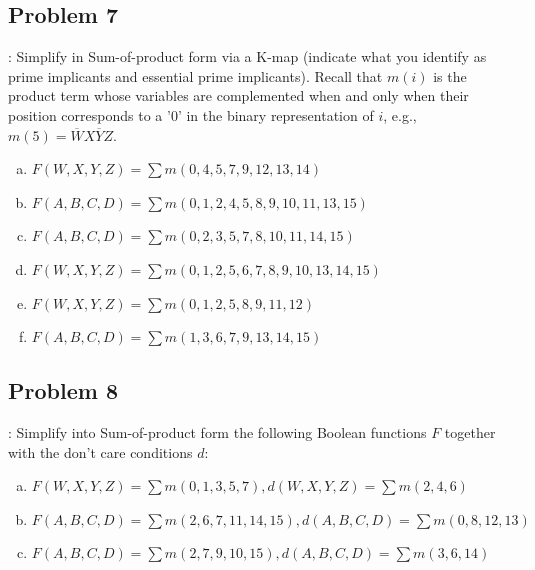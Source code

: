 \documentclass{../slides}
\begin{document}
\subsection{Problem 7}
\begin{frame}{\secname: \subsecname}
    Simplify in Sum-of-product form via a K-map (indicate what you identify as prime implicants and essential prime implicants). Recall that $m(i)$ is the product term whose variables are complemented when and only when their position corresponds to a ’0’ in the binary representation of $i$, e.g., $m(5) = \overbar{W}X\overbar{Y}Z$.
    \begin{enumerate}[(a)]
        \item $F(W, X, Y, Z) = \sum m(0, 4, 5, 7, 9, 12, 13, 14)$
        \item $F(A, B, C, D) = \sum m(0, 1, 2, 4, 5, 8, 9, 10, 11, 13, 15)$
        \item $F(A, B, C, D) = \sum m(0, 2, 3, 5, 7, 8, 10, 11, 14, 15)$
        \item $F(W, X, Y, Z) = \sum m(0, 1, 2, 5, 6, 7, 8, 9, 10, 13, 14, 15)$
        \item $F(W, X, Y, Z) = \sum m(0, 1, 2, 5, 8, 9, 11, 12)$
        \item $F(A, B, C, D) = \sum m(1, 3, 6, 7, 9, 13, 14, 15)$
    \end{enumerate}
\end{frame}

\subsection{Problem 8}
\begin{frame}{\secname: \subsecname}
    Simplify into Sum-of-product form the following Boolean functions $F$ together with the don't care conditions $d$:
    \begin{enumerate}[(a)]
        \item $F(W, X, Y, Z) = \sum m(0, 1, 3, 5, 7), d(W, X, Y, Z) = \sum m(2, 4, 6)$
        \item $F(A, B, C, D) = \sum m(2, 6, 7, 11, 14, 15), d(A, B, C, D) = \sum m(0, 8, 12, 13)$
        \item $F(A, B, C, D) = \sum m(2, 7, 9, 10, 15), d(A, B, C, D) = \sum m(3, 6, 14)$
    \end{enumerate}
\end{frame}
\end{document}
